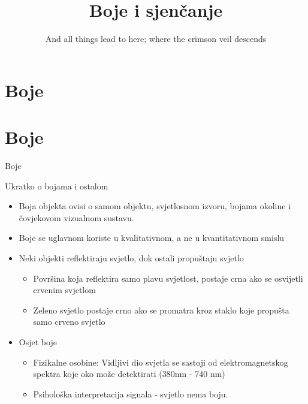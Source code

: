 \documentclass[9pt]{beamer}
\title{Boje i sjenčanje}
\subtitle {And all things lead to here; where the crimson veil descends}
\institute{Računalna grafika}
\begin{document}
\begin{frame}
 \titlepage
\end{frame}

\section{Boje}
\section{Boje}
\begin{frame}{Boje}
	\begin{block}{Ukratko o bojama i ostalom}
		\begin{itemize}
			\item Boja objekta ovisi o samom objektu, svjetlosnom izvoru, bojama okoline i čovjekovom vizualnom sustavu. 	
			\item Boje se uglavnom koriste u kvalitativnom, a ne u kvantitativnom smislu
			\item Neki objekti reflektiraju svjetlo, dok ostali propuštaju svjetlo
			\begin{itemize}
				\item Površina koja reflektira samo plavu svjetlost, postaje crna ako se osvijetli crvenim svjetlom
				\item Zeleno svjetlo postaje crno ako se promatra kroz staklo koje propušta samo crveno svjetlo
			\end{itemize}
			\item Osjet boje
			\begin{itemize}
				\item Fizikalne osobine: Vidljivi dio svjetla se sastoji od elektromagnetskog spektra koje oko može detektirati (380nm - 740 nm)
				\item Psihološka interpretacija signala - svjetlo nema boju.
			\end{itemize}
		\end{itemize}
	\end{block}
\end{frame}
\end{document}
